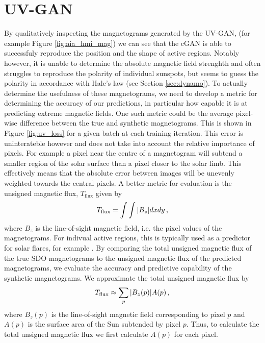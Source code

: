 \documentclass[11pt,a4paper,onecolumn]{report}
\begin{document}
\section{UV-GAN}
By qualitatively inspecting the magnetograms generated by the UV-GAN, (for
example Figure \ref{fig:aia_hmi_mag}) we can see that the cGAN is able to
successfuly reproduce the position and the shape of active regions. Notably
however, it is unable to determine the absolute magnetic field strenghth and
often struggles to reproduce the polarity of individual sunspots, but seems to
guess the polarity in accordance with Hale's law (see Section \ref{sec:dynamo}).
To actually determine the usefulness of these magnetograms, we need to develop a
metric for determining the accuracy of our predictions, in particular how
capable it is at predicting extreme magnetic fields. One such metric could be
the average pixel-wise difference between the true and synthetic magnetograms.
This is shown in Figure \ref{fig:uv_loss} for a given batch at each training
iteration. This error is uninterateble however and does not take into account
the relative importance of pixels. For example a pixel near the centre of a
magnetogram will subtend a smaller region of the solar surface than a pixel
closer to the solar limb. This effectively means that the absolute error between
images will be unevenly weighted towards the central pixels. A better metric for
evaluation is the unsigned magnetic flux, \(T_{\text{flux}}\) given by
\begin{align}
  T_{\text{flux}} = \int \int \absolutevalue{B_z} dx dy \, ,
\end{align}
where \(B_z\) is the line-of-sight magnetic field, i.e. the pixel values of the
magnetograms. For indivual active regions, this is typically used as a predictor
for solar flares, for example
\citet{song_statistical_2009,yuan_solar_2010,lan_automated_2012,chen_identifying_2019}.
By comparing the total unsigned magnetic flux of the true SDO magnetograms to
the unsigned magnetic flux of the predicted magnetograms, we evaluate the
accuracy and predictive capability of the synthetic magnetograms. We approximate
the total unsigned magnetic flux by 
\begin{align}
  T_{\text{flux}} \approx \sum\limits_p \absolutevalue{B_z(p)} A(p) \, ,
\end{align}
where $B_z(p)$ is the line-of-sight magnetic field corresponding to pixel $p$
and $A(p)$ is the surface area of the Sun subtended by pixel $p$. Thus, to
calculate the total unsigned magnetic flux we first calculate $A(p)$ for each
pixel.\\
\end{document}
